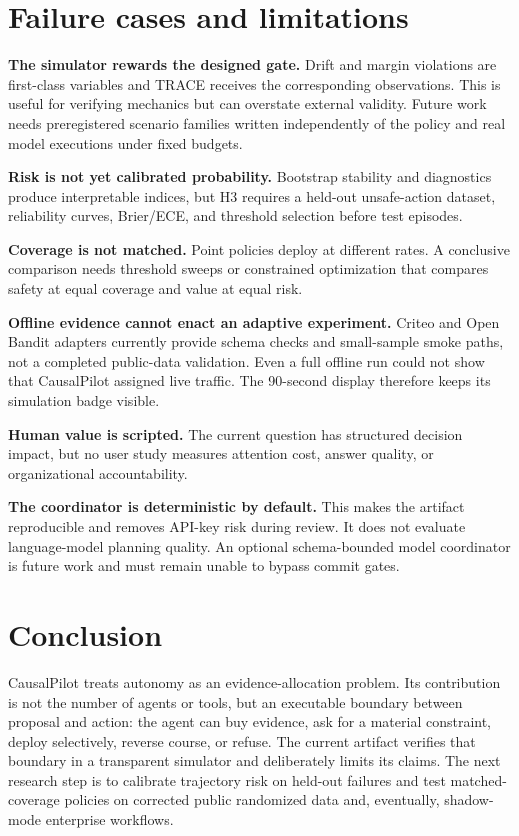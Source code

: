\documentclass[11pt,twocolumn]{article}
\begin{document}
\section{Failure cases and limitations}

\textbf{The simulator rewards the designed gate.} Drift and margin violations are first-class variables and TRACE receives the corresponding observations. This is useful for verifying mechanics but can overstate external validity. Future work needs preregistered scenario families written independently of the policy and real model executions under fixed budgets.

\textbf{Risk is not yet calibrated probability.} Bootstrap stability and diagnostics produce interpretable indices, but H3 requires a held-out unsafe-action dataset, reliability curves, Brier/ECE, and threshold selection before test episodes.

\textbf{Coverage is not matched.} Point policies deploy at different rates. A conclusive comparison needs threshold sweeps or constrained optimization that compares safety at equal coverage and value at equal risk.

\textbf{Offline evidence cannot enact an adaptive experiment.} Criteo and Open Bandit adapters currently provide schema checks and small-sample smoke paths, not a completed public-data validation. Even a full offline run could not show that CausalPilot assigned live traffic. The 90-second display therefore keeps its simulation badge visible.

\textbf{Human value is scripted.} The current question has structured decision impact, but no user study measures attention cost, answer quality, or organizational accountability.

\textbf{The coordinator is deterministic by default.} This makes the artifact reproducible and removes API-key risk during review. It does not evaluate language-model planning quality. An optional schema-bounded model coordinator is future work and must remain unable to bypass commit gates.

\section{Conclusion}

CausalPilot treats autonomy as an evidence-allocation problem. Its contribution is not the number of agents or tools, but an executable boundary between proposal and action: the agent can buy evidence, ask for a material constraint, deploy selectively, reverse course, or refuse. The current artifact verifies that boundary in a transparent simulator and deliberately limits its claims. The next research step is to calibrate trajectory risk on held-out failures and test matched-coverage policies on corrected public randomized data and, eventually, shadow-mode enterprise workflows.
\end{document}
